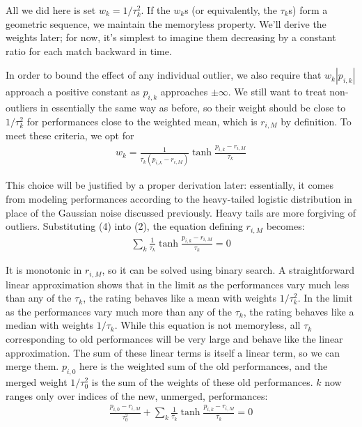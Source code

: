 \documentclass{article}
\begin{document}
All we did here is set $w_k = 1/\tau_k^2$. If the $w_k$s (or equivalently, the $\tau_k$s) form a geometric sequence, we maintain the memoryless property. We'll derive the weights later; for now, it's simplest to imagine them decreasing by a constant ratio for each match backward in time.

In order to bound the effect of any individual outlier, we also require that $w_k|p_{i,k}|$ approach a positive constant as $p_{i,k}$ approaches $\pm\infty$. We still want to treat non-outliers in essentially the same way as before, so their weight should be close to $1/\tau_k^2$ for performances close to the weighted mean, which is $r_{i,M}$ by definition. To meet these criteria, we opt for
\begin{align}
w_k = \frac{1}{\tau_k(p_{i,k} - r_{i,M})} \tanh\frac{p_{i,k} - r_{i,M}}{\tau_k}
\end{align}

This choice will be justified by a proper derivation later: essentially, it comes from modeling performances according to the heavy-tailed logistic distribution in place of the Gaussian noise discussed previously. Heavy tails are more forgiving of outliers. Substituting (4) into (2), the equation defining $r_{i,M}$ becomes:
\begin{align}
\sum_k \frac {1}{\tau_k} \tanh\frac{p_{i,k} - r_{i,M}}{\tau_k} = 0
\end{align}

It is monotonic in $r_{i,M}$, so it can be solved using binary search. A straightforward linear approximation shows that in the limit as the performances vary much less than any of the $\tau_k$, the rating behaves like a mean with weights $1/\tau_k^2$. In the limit as the performances vary much more than any of the $\tau_k$, the rating behaves like a median with weights $1/\tau_k$. While this equation is not memoryless, all $\tau_k$ corresponding to old performances will be very large and behave like the linear approximation. The sum of these linear terms is itself a linear term, so we can merge them. $p_{i,0}$ here is the weighted sum of the old performances, and the merged weight $1/\tau_0^2$ is the sum of the weights of these old performances. $k$ now ranges only over indices of the new, unmerged, performances:
\begin{align}
\frac{p_{i,0} - r_{i,M}}{\tau_0^2} + \sum_k \frac {1}{\tau_k} \tanh\frac{p_{i,k} - r_{i,M}}{\tau_k} = 0
\end{align}
\end{document}
